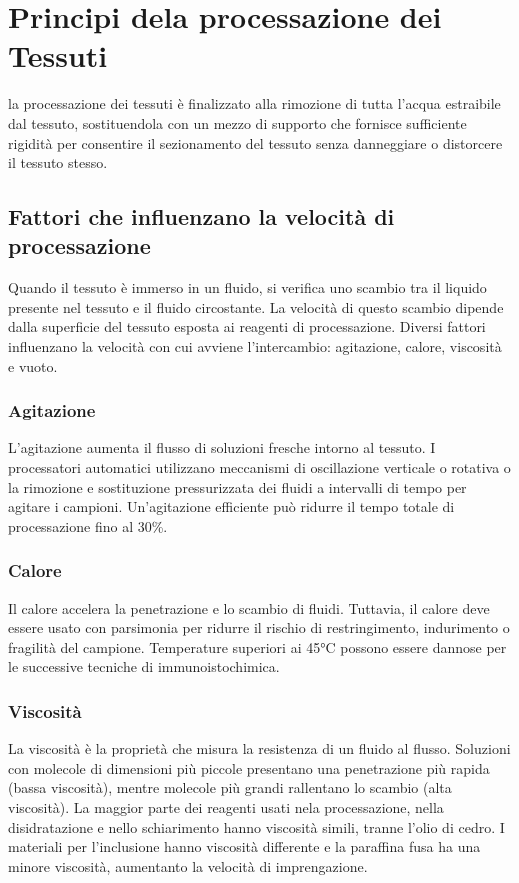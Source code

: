 \section{Principi dela processazione dei Tessuti}
la processazione dei tessuti è finalizzato alla rimozione di tutta l'acqua estraibile dal tessuto, sostituendola con un mezzo di supporto che fornisce sufficiente rigidità per consentire il sezionamento del tessuto senza danneggiare o distorcere il tessuto stesso.

\subsection{Fattori che influenzano la velocità di processazione}
Quando il tessuto è immerso in un fluido, si verifica uno scambio tra il liquido presente nel tessuto e il fluido circostante. La velocità di questo scambio dipende dalla superficie del tessuto esposta ai reagenti di processazione. Diversi fattori influenzano la velocità con cui avviene l'intercambio: agitazione, calore, viscosità e vuoto.

\subsubsection{Agitazione}
L'agitazione aumenta il flusso di soluzioni fresche intorno al tessuto. I processatori automatici utilizzano meccanismi di oscillazione verticale o rotativa o la rimozione e sostituzione pressurizzata dei fluidi a intervalli di tempo per agitare i campioni. Un'agitazione efficiente può ridurre il tempo totale di processazione fino al 30\%.

\subsubsection{Calore}
Il calore accelera la penetrazione e lo scambio di fluidi. Tuttavia, il calore deve essere usato con parsimonia per ridurre il rischio di restringimento, indurimento o fragilità del campione. Temperature superiori ai 45°C possono essere dannose per le successive tecniche di immunoistochimica.

\subsubsection{Viscosità}
La viscosità è la proprietà che misura la resistenza di un fluido al flusso. Soluzioni con molecole di dimensioni più piccole presentano una penetrazione più rapida (bassa viscosità), mentre molecole più grandi rallentano lo scambio (alta viscosità). La maggior parte dei reagenti usati nela processazione, nella disidratazione e nello schiarimento hanno viscosità simili, tranne l'olio di cedro. I materiali per l'inclusione hanno viscosità differente e la paraffina fusa ha una minore viscosità, aumentanto la velocità di imprengazione.

